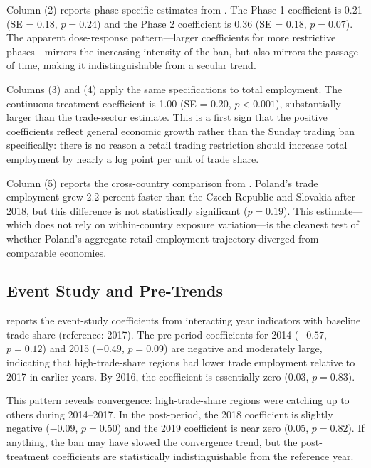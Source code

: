 \documentclass[12pt]{article}
\begin{document}
Column (2) reports phase-specific estimates from . The Phase 1 coefficient is 0.21 (SE = 0.18, $p = 0.24$) and the Phase 2 coefficient is 0.36 (SE = 0.18, $p = 0.07$). The apparent dose-response pattern---larger coefficients for more restrictive phases---mirrors the increasing intensity of the ban, but also mirrors the passage of time, making it indistinguishable from a secular trend.

Columns (3) and (4) apply the same specifications to total employment. The continuous treatment coefficient is 1.00 (SE = 0.20, $p < 0.001$), substantially larger than the trade-sector estimate. This is a first sign that the positive coefficients reflect general economic growth rather than the Sunday trading ban specifically: there is no reason a retail trading restriction should increase total employment by nearly a log point per unit of trade share.

Column (5) reports the cross-country comparison from . Poland's trade employment grew 2.2 percent faster than the Czech Republic and Slovakia after 2018, but this difference is not statistically significant ($p = 0.19$). This estimate---which does not rely on within-country exposure variation---is the cleanest test of whether Poland's aggregate retail employment trajectory diverged from comparable economies.




\subsection{Event Study and Pre-Trends}

 reports the event-study coefficients from interacting year indicators with baseline trade share (reference: 2017). The pre-period coefficients for 2014 ($-0.57$, $p = 0.12$) and 2015 ($-0.49$, $p = 0.09$) are negative and moderately large, indicating that high-trade-share regions had lower trade employment relative to 2017 in earlier years. By 2016, the coefficient is essentially zero (0.03, $p = 0.83$).

This pattern reveals convergence: high-trade-share regions were catching up to others during 2014--2017. In the post-period, the 2018 coefficient is slightly negative ($-0.09$, $p = 0.50$) and the 2019 coefficient is near zero (0.05, $p = 0.82$). If anything, the ban may have slowed the convergence trend, but the post-treatment coefficients are statistically indistinguishable from the reference year.
\end{document}
